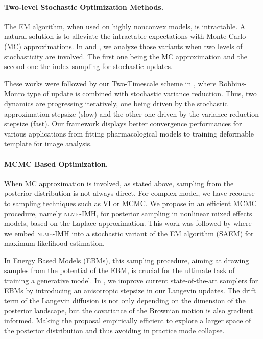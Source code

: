 \documentclass[twoside,11pt]{article}
\begin{document}
\vspace{0.08in}
\paragraph{Two-level Stochastic Optimization Methods.} 
The EM algorithm, when used on highly nonconvex models, is intractable.
A natural solution is to alleviate the intractable expectations with Monte Carlo (MC) approximations.
In \citep{karimi2019convergence} and \citep{karimi2020misso}, we analyze those variants when two levels of stochasticity are involved.
The first one being the MC approximation and the second one the index sampling for stochastic updates.

These works were followed by our Two-Timescale scheme in \citep{karimi2020tts}, where Robbins-Monro type of update is combined with stochastic variance reduction.
Thus, two dynamics are progressing iteratively, one being driven by the stochastic approximation stepsize (slow) and the other one driven by the variance reduction stepsize (fast).
Our framework displays better convergence performances for various applications from fitting pharmacological models to training deformable template for image analysis.

\vspace{0.08in}
\paragraph{MCMC Based Optimization.} 

When MC approximation is involved, as stated above, sampling from the posterior distribution is not always direct.
For complex model, we have recourse to sampling techniques such as VI or MCMC.
We propose in \citep{karimi2018eff} an efficient MCMC procedure, namely \textsc{nlme-IMH}, for posterior sampling in nonlinear mixed effects models, based on the Laplace approximation.
This work was followed by \citep{karimi2018fsaem} where we embed \textsc{nlme-IMH} into a stochastic variant of the EM algorithm (SAEM) for maximum likelihood estimation.

In Energy Based Models (EBMs), this sampling procedure, aiming at drawing samples from the potential of the EBM, is crucial for the ultimate task of training a generative model.
In \citep{karimi2020anila}, we improve current state-of-the-art samplers for EBMs by introducing an anisotropic stepsize in our Langevin updates.
The drift term of the Langevin diffusion is not only depending on the dimension of the posterior landscape, but the covariance of the Brownian motion is also gradient informed. 
Making the proposal empirically efficient to explore a larger space of the posterior distribution and thus avoiding in practice mode collapse.
\end{document}
